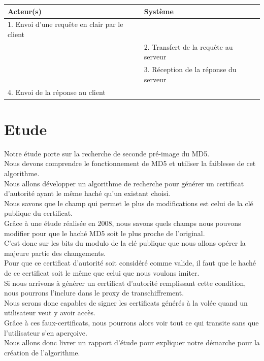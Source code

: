 \documentclass[a4paper,11pt,french]{article}
\begin{document}
\begin{tabular}{|m{8cm}|m{8cm}|}
   \hline
  \rowcolor[gray]{.8} Acteur(s) & Système \\
   \hline
   1. Envoi d'une requête en clair par le client & \\
   \hline
& 2. Transfert de la requête au serveur  \\
& 3. Réception de la réponse du serveur  \\
   \hline
  
4. Envoi de la réponse au client  &  \\
   \hline
\end{tabular}

\section{Etude}

Notre étude porte sur la recherche de seconde pré-image du MD5.\\
Nous devons comprendre le fonctionnement de MD5 et utiliser la faiblesse de cet algorithme.\\
Nous allons développer un algorithme de recherche pour générer un certificat d'autorité ayant le même haché qu'un existant choisi.\\
Nous savons que le champ qui permet le plus de modifications est celui de la clé publique du certificat.\\
Grâce à une étude réalisée en 2008, nous savons quels champs nous pouvons modifier pour que le haché MD5 soit le plus proche de l'original.\\
C'est donc sur les bits du modulo de la clé publique que nous allons opérer la majeure partie des changements.\\
Pour que ce certificat d'autorité soit considéré comme valide, il faut que le haché de ce certificat soit le même que celui que nous voulons imiter.\\
Si nous arrivons à générer un certificat d'autorité remplissant cette condition, nous pourrons l'inclure dans le proxy de transchiffrement.\\
Nous serons donc capables de signer les certificats générés à la volée quand un utilisateur veut y avoir accès.\\
Grâce à ces faux-certificats, nous pourrons alors voir tout ce qui transite sans que l'utilisateur s'en aperçoive.\\
Nous allons donc livrer un rapport d'étude pour expliquer notre démarche pour la création de l'algorithme.\\
\end{document}
